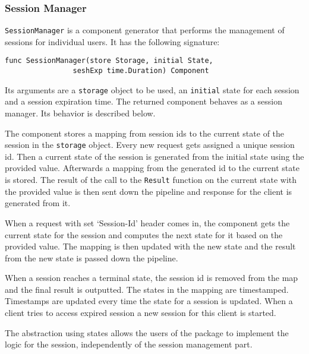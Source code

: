 \subsubsection{Session Manager}
\texttt{SessionManager} is a component generator that performs the 
management of sessions for individual users. It has the following signature:
\begin{lstlisting}
func SessionManager(store Storage, initial State, 
                seshExp time.Duration) Component
\end{lstlisting}
Its arguments are a \texttt{storage} object to be used, an \texttt{initial} 
state for each session and
a session expiration time.
The returned component behaves as a session manager. 
Its behavior is described below.

The component stores a mapping from session ids to the current state of the session
in the \texttt{storage} object.
Every new request gets assigned a unique session id. Then a current state
of the session is generated from the initial state using the provided
value. Afterwards a mapping from the generated id to the current state
is stored. The result of the call to the \texttt{Result} function on the
current state with the provided value is then sent down the pipeline and
response for the client is generated from it.

When a request with set `Session-Id' header comes in, the component gets the current 
state for the session and computes the next state for it based on the provided value.
The mapping is then updated with the new state and the result from the new state
is passed down the pipeline.

When a session reaches a terminal state, the session id is removed from the map
and the final result is outputted.
The states in the mapping are timestamped. Timestamps are updated every time
the state for a session is updated. When a client tries to access expired
session a new session for this client is started.

The abstraction using states allows the users of the package to implement the
logic for the session, independently of the session management part.


